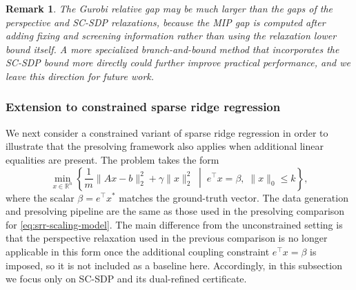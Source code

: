 \documentclass[11pt]{article}
\def\R{\mathbb{R}}
\theoremstyle{plain}
\newtheorem{remark}{Remark}
\begin{document}
\begin{remark}
    The Gurobi relative gap may be much larger than the gaps of the perspective and SC-SDP relaxations, because the MIP gap is computed after adding fixing and screening information rather than using the relaxation lower bound itself. A more specialized branch-and-bound method that incorporates the SC-SDP bound more directly could further improve practical performance, and we leave this direction for future work.
\end{remark}


\subsubsection{Extension to constrained sparse ridge regression}

We next consider a constrained variant of sparse ridge regression in order to illustrate that the presolving framework also applies when additional linear equalities are present. The problem takes the form
\begingroup
\renewcommand{\theequation}{SRR-E}
\begin{equation}\label{eq:srr-equality-model}
\min_{x\in\R^n}\left\{\frac{1}{m}\|Ax-b\|_2^2+\gamma\|x\|_2^2
\;\middle|\;
e^\top x=\beta,\; \|x\|_0\le k
\right\},
\tag{SRR-E}
\end{equation}
\endgroup
where the scalar $\beta=e^\top x^*$ matches the ground-truth vector. 
The data generation and presolving pipeline are the same as those used in the
presolving comparison for \eqref{eq:srr-scaling-model}. The main difference
from the unconstrained setting is that the perspective relaxation used in the
previous comparison is no longer applicable in this form once the additional
coupling constraint \(e^\top x=\beta\) is imposed, so it is not included as a
baseline here. Accordingly, in this subsection we focus only on SC-SDP and its
dual-refined certificate.
\end{document}
